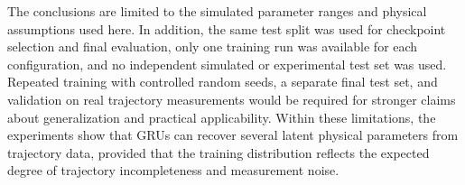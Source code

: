 The conclusions are limited to the simulated parameter ranges and physical assumptions used here. In addition, the same test split was used for checkpoint selection and final evaluation, only one training run was available for each configuration, and no independent simulated or experimental test set was used. Repeated training with controlled random seeds, a separate final test set, and validation on real trajectory measurements would be required for stronger claims about generalization and practical applicability. Within these limitations, the experiments show that GRUs can recover several latent physical parameters from trajectory data, provided that the training distribution reflects the expected degree of trajectory incompleteness and measurement noise.
